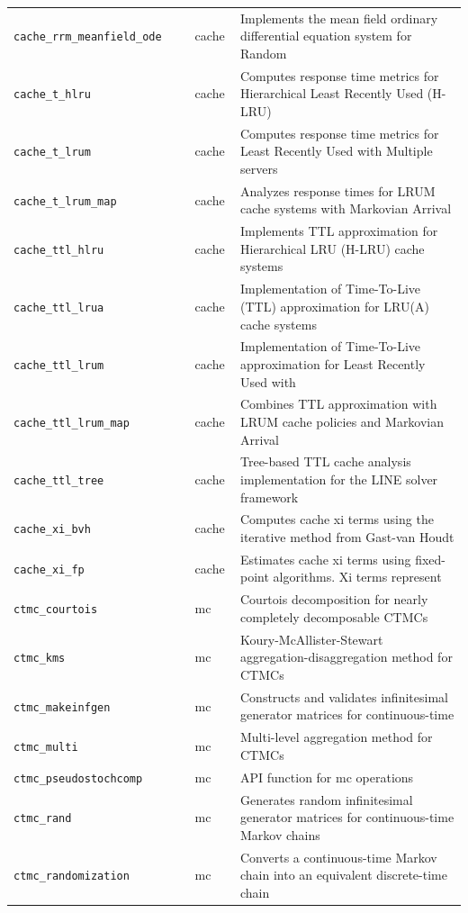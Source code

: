 \begin{footnotesize}
\begin{longtable}{|p{0.4\linewidth}|p{0.1\linewidth}|p{0.5\linewidth}|}
\texttt{cache\_rrm\_meanfield\_ode} & cache & Implements the mean field ordinary differential equation system for Random\\
\texttt{cache\_t\_hlru} & cache & Computes response time metrics for Hierarchical Least Recently Used (H-LRU)\\
\texttt{cache\_t\_lrum} & cache & Computes response time metrics for Least Recently Used with Multiple servers\\
\texttt{cache\_t\_lrum\_map} & cache & Analyzes response times for LRUM cache systems with Markovian Arrival\\
\texttt{cache\_ttl\_hlru} & cache & Implements TTL approximation for Hierarchical LRU (H-LRU) cache systems\\
\texttt{cache\_ttl\_lrua} & cache & Implementation of Time-To-Live (TTL) approximation for LRU(A) cache systems\\
\texttt{cache\_ttl\_lrum} & cache & Implementation of Time-To-Live approximation for Least Recently Used with\\
\texttt{cache\_ttl\_lrum\_map} & cache & Combines TTL approximation with LRUM cache policies and Markovian Arrival\\
\texttt{cache\_ttl\_tree} & cache & Tree-based TTL cache analysis implementation for the LINE solver framework\\
\texttt{cache\_xi\_bvh} & cache & Computes cache xi terms using the iterative method from Gast-van Houdt\\
\texttt{cache\_xi\_fp} & cache & Estimates cache xi terms using fixed-point algorithms. Xi terms represent\\
\texttt{ctmc\_courtois} & mc & Courtois decomposition for nearly completely decomposable CTMCs\\
\texttt{ctmc\_kms} & mc & Koury-McAllister-Stewart aggregation-disaggregation method for CTMCs\\
\texttt{ctmc\_makeinfgen} & mc & Constructs and validates infinitesimal generator matrices for continuous-time\\
\texttt{ctmc\_multi} & mc & Multi-level aggregation method for CTMCs\\
\texttt{ctmc\_pseudostochcomp} & mc & API function for mc operations\\
\texttt{ctmc\_rand} & mc & Generates random infinitesimal generator matrices for continuous-time Markov chains\\
\texttt{ctmc\_randomization} & mc & Converts a continuous-time Markov chain into an equivalent discrete-time chain\\

\end{longtable}
\end{footnotesize}

